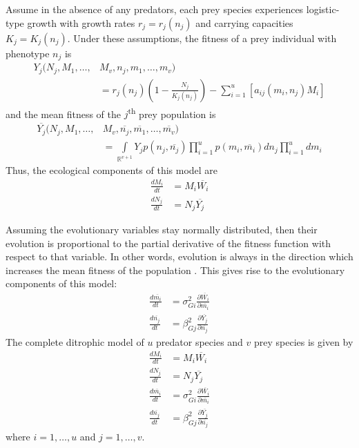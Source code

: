 \documentclass{amsart}
\theoremstyle{definition}
\theoremstyle{remark}
\numberwithin{equation}{section}
\begin{document}
Assume in the absence of any predators, each prey species experiences logistic-type growth with growth rates $r_j = r_j(n_j)$ and carrying capacities $K_j = K_j(n_j)$.  Under these assumptions, the fitness of a prey individual with phenotype $n_j$ is
\begin{equation}
	\label{prey_fitness}
	\begin{aligned}
		Y_j(N_j, M_1, \dots, &M_v, n_j, m_1, \dots, m_v) \\
		&= r_j(n_j)\left(1 - \frac{N_j}{K_j(n_j)}\right) - \sum\limits_{i = 1}^{u}\left[a_{ij}(m_i, n_j)M_i\right]
	\end{aligned}
\end{equation}
and the mean fitness of the $j$\textsuperscript{th} prey population is
\begin{equation}
	\label{avg_prey_fitness}
	\begin{aligned}
		\overline{Y_j}(N_j, M_1, \dots, &M_v, \overline{n_j}, \overline{m_1}, \dots, \overline{m_v}) \\
		&= \int\limits_{\mathbb{R}^{v+1}}^{}Y_jp(n_j, \overline{n_j})\prod\limits_{i = 1}^{u}p(m_i, \overline{m_i})dn_j\prod\limits_{i = 1}^{u}dm_i
	\end{aligned}
\end{equation}
Thus, the ecological components of this model are
\begin{align*}
	\frac{dM_i}{dt} &= M_i\overline{W_i} \\[5px]
	\frac{dN_j}{dt} &= N_j\overline{Y_j}
\end{align*}

Assuming the evolutionary variables stay normally distributed, then their evolution is proportional to the partial derivative of the fitness function with respect to that variable.  In other words, evolution is always in the direction which increases the mean fitness of the population \cite{Lande_1976}.  This gives rise to the evolutionary components of this model:
\begin{align*}
	\frac{d\overline{m_i}}{dt} &= \sigma_{Gi}^2\frac{\partial \overline{W_i}}{\partial \overline{m_i}} \\[5px]
	\frac{d\overline{n_j}}{dt} &= \beta_{Gj}^2\frac{\partial \overline{Y_j}}{\partial \overline{n_j}}
\end{align*}
The complete ditrophic model of $u$ predator species and $v$ prey species is given by
\begin{subequations}
	\label{general_model}
	\begin{align}
		\label{eq:general_model_a}
		\frac{dM_i}{dt} &= M_i\overline{W_i} \\[5px]
		\label{eq:general_model_b}
		\frac{dN_j}{dt} &= N_j\overline{Y_j} \\[5px]
		\label{eq:general_model_c}
		\frac{d\overline{m_i}}{dt} &= \sigma_{Gi}^2\frac{\partial \overline{W_i}}{\partial \overline{m_i}} \\[5px]
		\label{eq:general_model_d} 
		\frac{d\overline{n_j}}{dt} &= \beta_{Gj}^2\frac{\partial \overline{Y_j}}{\partial \overline{n_j}}
	\end{align}
\end{subequations}
where $i = 1, \dots, u$ and $j = 1, \dots, v$. \\
\end{document}
